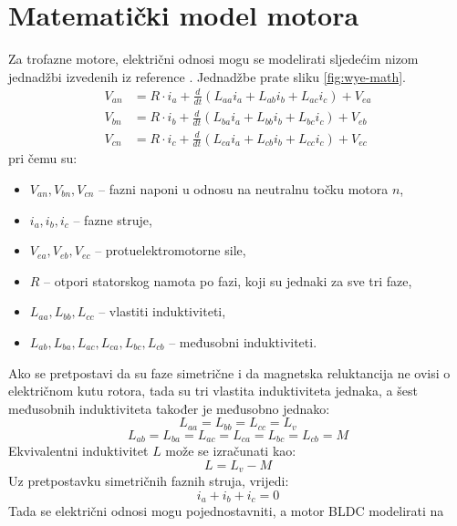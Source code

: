 \documentclass[diplomskirad]{fer}
\begin{document}
\newpage

\section{Matematički model motora}
\label{sec:mat_model}
Za trofazne motore, električni odnosi mogu se modelirati sljedećim nizom jednadžbi izvedenih iz reference \cite{}. Jednadžbe prate sliku \ref{fig:wye-math}.
\begin{align}
	V_{an} & = R \cdot i_a + \frac{d}{dt}(L_{aa}i_a + L_{ab}i_b + L_{ac}i_c) + V_{ea} \\
	V_{bn} & = R \cdot i_b + \frac{d}{dt}(L_{ba}i_a + L_{bb}i_b + L_{bc}i_c) + V_{eb} \\
	V_{cn} & = R \cdot i_c + \frac{d}{dt}(L_{ca}i_a + L_{cb}i_b + L_{cc}i_c) + V_{ec}
\end{align}
pri čemu su:
\begin{itemize}
	\item $V_{an}, V_{bn}, V_{cn}$ -- fazni naponi u odnosu na neutralnu točku motora $n$,
	\item $i_a, i_b, i_c$ -- fazne struje,
	\item $V_{ea}, V_{eb}, V_{ec}$ -- protuelektromotorne sile,
	\item $R$ -- otpori statorskog namota po fazi, koji su jednaki za sve tri faze,
	\item $L_{aa}, L_{bb}, L_{cc}$ -- vlastiti induktiviteti,
	\item $L_{ab}, L_{ba}, L_{ac}, L_{ca}, L_{bc}, L_{cb}$ -- međusobni induktiviteti.
\end{itemize}
Ako se pretpostavi da su faze simetrične i da magnetska reluktancija ne ovisi o
električnom kutu rotora, tada su tri vlastita induktiviteta jednaka, a šest
međusobnih induktiviteta također je međusobno jednako:
\begin{equation}
	L_{aa} = L_{bb} = L_{cc} = L_v \tag{2.4}
\end{equation}
\begin{equation}
	L_{ab} = L_{ba} = L_{ac} = L_{ca} = L_{bc} = L_{cb} = M \tag{2.5}
\end{equation}
Ekvivalentni induktivitet $L$ može se izračunati kao:
\begin{equation}
	L = L_v - M \tag{2.6}
\end{equation}
Uz pretpostavku simetričnih faznih struja, vrijedi:
\begin{equation}
	i_a + i_b + i_c = 0 \tag{2.7}
\end{equation}
Tada se električni odnosi mogu pojednostavniti, a motor BLDC modelirati na
\end{document}
